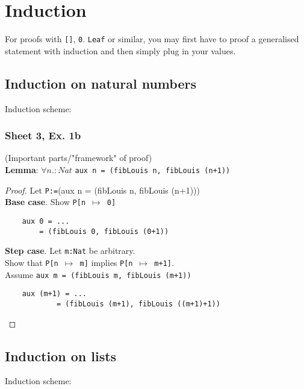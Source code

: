 \documentclass[11.5pt]{article}
\def\fan{\forall n. : Nat}
\begin{document}
\section{Induction}
For proofs with \texttt{[]}, \texttt{0}. \texttt{Leaf} or similar, you may first have to proof a generalised statement with 
induction and then simply plug in your values.
\subsection{Induction on natural numbers}
Induction scheme:
\begin{prooftree}
\end{prooftree}

\subsubsection{Sheet 3, Ex. 1b}
(Important parts/"framework" of proof) \\
\textbf{Lemma}: $\fan$ \texttt{aux n = (fibLouis n, fibLouis (n+1))}
\begin{proof}
    Let \texttt{P:=}(aux n = (fibLouis n, fibLouis (n+1)))\\
    \textbf{Base case}. Show \texttt{P[n $\mapsto$ 0]} 
    \begin{verbatim}
    aux 0 = ...
        = (fibLouis 0, fibLouis (0+1))
    \end{verbatim}
    \textbf{Step case}. Let \texttt{m:Nat} be arbitrary. \\
    Show that \texttt{P[n $\mapsto$ m]} implies \texttt{P[n $\mapsto$ m+1]}. \\
    Assume \texttt{aux m = (fibLouis m, fibLouis (m+1))}
    \begin{verbatim}
    aux (m+1) = ...
            = (fibLouis (m+1), fibLouis ((m+1)+1)) 
    \end{verbatim}
\end{proof}

\subsection{Induction on lists}

Induction scheme:
\begin{prooftree}
\end{prooftree}
\end{document}
